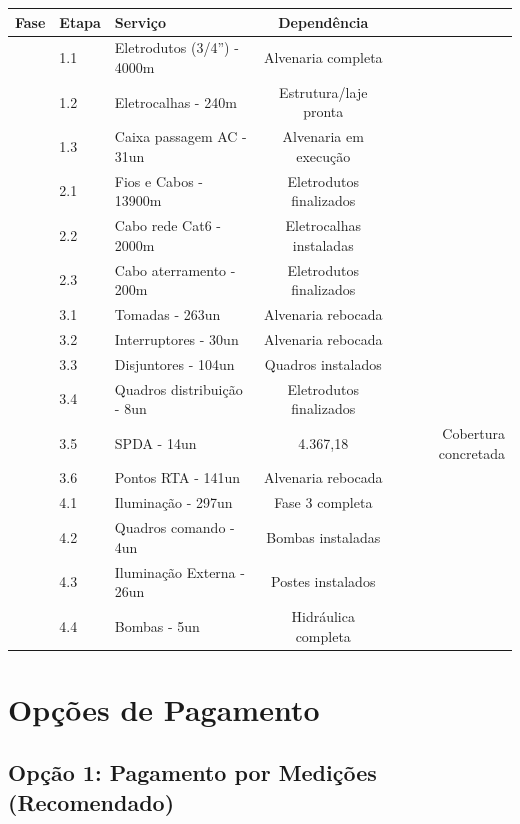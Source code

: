 \documentclass[12pt,a4paper]{article}
\renewenvironment{table}%
{\begin{center}%
\scriptsize%
\addtolength{\tabcolsep}{-2pt}%
}%
{\end{center}}
\begin{document}
\begin{table}
\centering
\begin{tabular}{cllcr}
\toprule
\textbf{Fase} & \textbf{Etapa} & \textbf{Serviço} & \textbf{Dependência} \\
\midrule
 & 1.1 & Eletrodutos (3/4'') - 4000m & Alvenaria completa \\
 & 1.2 & Eletrocalhas - 240m & Estrutura/laje pronta \\
 & 1.3 & Caixa passagem AC - 31un & Alvenaria em execução \\
\midrule
 & 2.1 & Fios e Cabos - 13900m & Eletrodutos finalizados \\
 & 2.2 & Cabo rede Cat6 - 2000m & Eletrocalhas instaladas \\
 & 2.3 & Cabo aterramento - 200m & Eletrodutos finalizados \\
\midrule
 & 3.1 & Tomadas - 263un & Alvenaria rebocada \\
 & 3.2 & Interruptores - 30un & Alvenaria rebocada \\
 & 3.3 & Disjuntores - 104un & Quadros instalados \\
 & 3.4 & Quadros distribuição - 8un & Eletrodutos finalizados \\
 & 3.5 & SPDA - 14un & 4.367,18 & Cobertura concretada \\
 & 3.6 & Pontos RTA - 141un & Alvenaria rebocada \\
\midrule
 & 4.1 & Iluminação - 297un & Fase 3 completa \\
 & 4.2 & Quadros comando - 4un & Bombas instaladas \\
 & 4.3 & Iluminação Externa - 26un & Postes instalados \\
 & 4.4 & Bombas - 5un & Hidráulica completa \\
\bottomrule
\end{tabular}
\end{table}

\section{Opções de Pagamento}

\subsection{Opção 1: Pagamento por Medições (Recomendado)}
\end{document}
